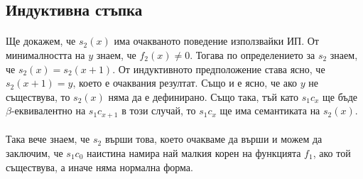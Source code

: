 \documentclass[12pt]{article}
\begin{document}
\subsection*{Индуктивна стъпка}
\paragraph*{}
Ще докажем, че $s_2(x)$ има очакваното поведение използвайки ИП. От минималността на $y$ знаем, че $f_2(x) \neq 0$. Тогава по определението за $s_2$ знаем, че $s_2(x) = s_2(x+1)$. От индуктивното предположение става ясно, че $s_2(x+1) = y$, което е очаквания резултат. Също и е ясно, че ако $y$ не съществува, то $s_2(x)$ няма да е дефинирано. Също така, тъй като $s_1 c_x$ ще бъде $\beta$-еквивалентно на $s_1 c_{x+1}$ в този случай, то $s_1 c_x$ ще има семантиката на $s_2(x)$.

\paragraph*{}
Така вече знаем, че $s_2$ върши това, което очакваме да върши и можем да заключим, че $s_1 c_0$ наистина намира най малкия корен на функцията $f_1$, ако той съществува, а иначе няма нормална форма. 
\end{document}

